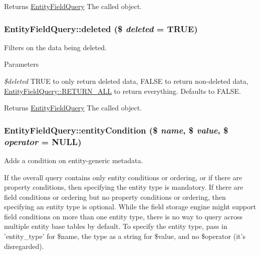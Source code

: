\begin{DoxyReturn}{Returns}
\hyperlink{classEntityFieldQuery}{EntityFieldQuery} The called object. 
\end{DoxyReturn}
\hypertarget{classEntityFieldQuery_a49543cc7ea0841ba46d4ebe310695ce3}{
\subsubsection[{deleted}]{\setlength{\rightskip}{0pt plus 5cm}EntityFieldQuery::deleted (\$ {\em deleted} = {\ttfamily TRUE})}}
\label{classEntityFieldQuery_a49543cc7ea0841ba46d4ebe310695ce3}
Filters on the data being deleted.


\begin{DoxyParams}{Parameters}
\item[{\em \$deleted}]TRUE to only return deleted data, FALSE to return non-\/deleted data, \hyperlink{classEntityFieldQuery_a1d63c58e6b1d99e6034d96875305fe0d}{EntityFieldQuery::RETURN\_\-ALL} to return everything. Defaults to FALSE.\end{DoxyParams}
\begin{DoxyReturn}{Returns}
\hyperlink{classEntityFieldQuery}{EntityFieldQuery} The called object. 
\end{DoxyReturn}
\hypertarget{classEntityFieldQuery_a08559bd2f164f707a7ad18eff6622017}{
\subsubsection[{entityCondition}]{\setlength{\rightskip}{0pt plus 5cm}EntityFieldQuery::entityCondition (\$ {\em name}, \/  \$ {\em value}, \/  \$ {\em operator} = {\ttfamily NULL})}}
\label{classEntityFieldQuery_a08559bd2f164f707a7ad18eff6622017}
Adds a condition on entity-\/generic metadata.

If the overall query contains only entity conditions or ordering, or if there are property conditions, then specifying the entity type is mandatory. If there are field conditions or ordering but no property conditions or ordering, then specifying an entity type is optional. While the field storage engine might support field conditions on more than one entity type, there is no way to query across multiple entity base tables by default. To specify the entity type, pass in 'entity\_\-type' for \$name, the type as a string for \$value, and no \$operator (it's disregarded).


